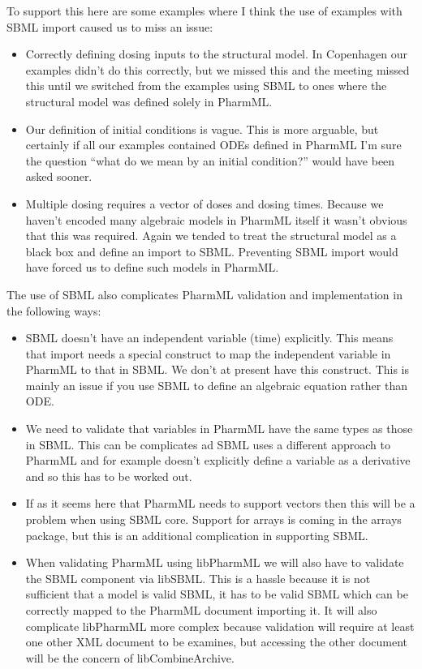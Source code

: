 \documentclass[a4paper,10pt]{article}
\newcommand{\pharmml}{PharmML\xspace}
\begin{document}
To support this here are some examples where I think the use of
examples with SBML import caused us to miss an issue:

\begin{itemize}
\item Correctly defining dosing inputs to the structural model. In
  Copenhagen our examples didn't do this correctly, but we missed this
  and the meeting missed this until we switched from the examples
  using SBML to ones where the structural model was defined solely in
  \pharmml.
\item Our definition of initial conditions is vague. This is more
  arguable, but certainly if all our examples contained ODEs defined
  in \pharmml I'm sure the question ``what do we mean by an initial
  condition?'' would have been asked sooner.
\item Multiple dosing requires a vector of doses and dosing
  times. Because we haven't encoded many algebraic models in \pharmml
  itself it wasn't obvious that this was required. Again we tended to
  treat the structural model as a black box and define an import to
  SBML. Preventing SBML import would have forced us to define such
  models in \pharmml.
\end{itemize}

The use of SBML also complicates \pharmml validation and
implementation in the following ways:

\begin{itemize}
\item SBML doesn't have an independent variable (time)
  explicitly. This means that import needs a special construct to map
  the independent variable in \pharmml to that in SBML. We don't at
  present have this construct. This is mainly an issue if you use SBML
  to define an algebraic equation rather than ODE.
\item We need to validate that variables in \pharmml have the same
  types as those in SBML. This can be complicates ad SBML uses a
  different approach to \pharmml and for example doesn't explicitly
  define a variable as a derivative and so this has to be worked out.
\item If as it seems here that \pharmml needs to support vectors then
  this will be a problem when using SBML core. Support for arrays is
  coming in the arrays package, but this is an additional complication
  in supporting SBML.
\item When validating \pharmml using libPharmML we will also have to
  validate the SBML component via libSBML. This is a hassle because it
  is not sufficient that a model is valid SBML, it has to be valid
  SBML which can be correctly mapped to the \pharmml document
  importing it. It will also complicate libPharmML more complex
  because validation will require at least one other XML document to
  be examines, but accessing the other document will be the concern of
  libCombineArchive.
\end{itemize}
\end{document}

